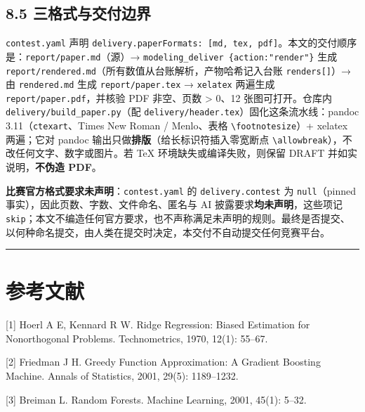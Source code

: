 \documentclass[
  11pt,
]{ctexart}
\begin{document}
\subsection{8.5
三格式与交付边界}\label{ux4e09ux683cux5f0fux4e0eux4ea4ux4ed8ux8fb9ux754c}

\texttt{contest.yaml} 声明
\texttt{delivery.paperFormats:\ {[}md,\ tex,\ pdf{]}}。本文的交付顺序是：\texttt{report/\allowbreak{}paper.\allowbreak{}md}（源）→
\texttt{modeling\_deliver\ \{action:"render"\}} 生成
\texttt{report/\allowbreak{}rendered.\allowbreak{}md}（所有数值从台账解析，产物哈希记入台账
\texttt{renders{[}{]}}）→ 由 \texttt{rendered.md} 生成
\texttt{report/\allowbreak{}paper.\allowbreak{}tex} → \texttt{xelatex} 两遍生成
\texttt{report/\allowbreak{}paper.\allowbreak{}pdf}，并核验 PDF 非空、页数 \textgreater{} 0、12
张图可打开。仓库内 \texttt{delivery/\allowbreak{}build\_\allowbreak{}paper.\allowbreak{}py}（配
\texttt{delivery/\allowbreak{}header.\allowbreak{}tex}）固化这条流水线：pandoc
3.11（\texttt{ctexart}、Times New Roman / Menlo、表格
\texttt{\textbackslash{}footnotesize}）+ xelatex 两遍；它对 pandoc
输出只做\textbf{排版}（给长标识符插入零宽断点
\texttt{\textbackslash{}allowbreak}），不改任何文字、数字或图片。若 TeX
环境缺失或编译失败，则保留 DRAFT 并如实说明，\textbf{不伪造 PDF}。

\textbf{比赛官方格式要求未声明}：\texttt{contest.yaml} 的
\texttt{delivery.\allowbreak{}contest} 为 \texttt{null}（pinned
事实），因此页数、字数、文件命名、匿名与 AI
披露要求\textbf{均未声明}，这些项记
\texttt{skip}；本文不编造任何官方要求，也不声称满足未声明的规则。最终是否提交、以何种命名提交，由人类在提交时决定，本交付不自动提交任何竞赛平台。

\begin{center}\rule{0.5\linewidth}{0.5pt}\end{center}

\section{参考文献}\label{ux53c2ux8003ux6587ux732e}

{[}1{]} Hoerl A E, Kennard R W. Ridge Regression: Biased Estimation for
Nonorthogonal Problems. Technometrics, 1970, 12(1): 55--67.

{[}2{]} Friedman J H. Greedy Function Approximation: A Gradient Boosting
Machine. Annals of Statistics, 2001, 29(5): 1189--1232.

{[}3{]} Breiman L. Random Forests. Machine Learning, 2001, 45(1): 5--32.
\end{document}
